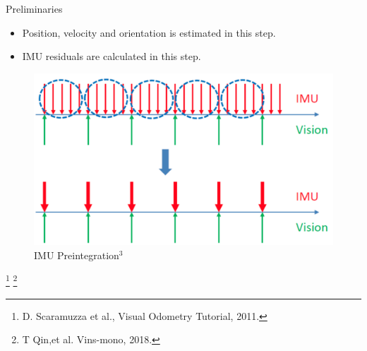 \documentclass[10pt]{beamer}
\begin{document}
\begin{frame}{Preliminaries}
\begin{minipage}{0.47\textwidth}
\begin{itemize}
            \item Position, velocity and orientation is estimated in this step.
            \item IMU residuals are calculated in this step.
        \end{itemize}
        \begin{figure}[h!]
            \centering
            \includegraphics[scale=0.1]{Imu_preintegration.png}
            \caption{IMU Preintegration$^3$}
            \label{fig: imu_pre}
        \end{figure}
    \end{minipage}
    \footnote{D. Scaramuzza et al., Visual Odometry Tutorial, 2011.}
    \footnote{T Qin,et al. Vins-mono, 2018.}
\end{frame}
\end{document}

